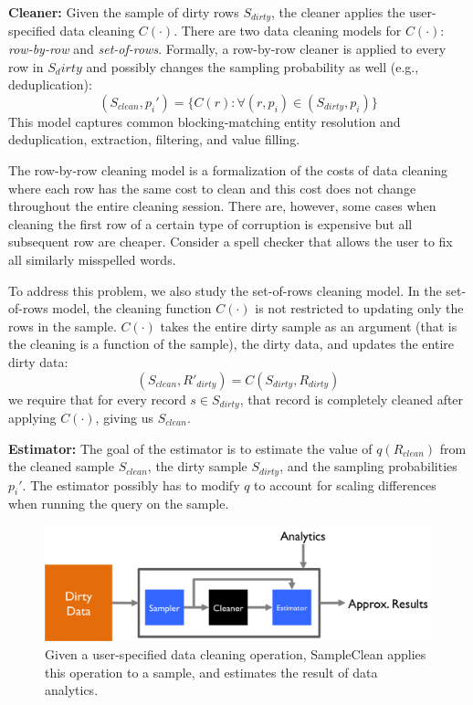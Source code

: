\vspace{0.5em}
\noindent\textbf{Cleaner: }
Given the sample of dirty rows $S_{dirty}$,  the cleaner applies the user-specified data cleaning $C(\cdot)$. There are two data cleaning models for $C(\cdot)$: \emph{row-by-row} and \emph{set-of-rows}.
Formally, a row-by-row cleaner is applied to every row in $S_dirty$ and possibly changes the sampling probability as well (e.g., deduplication):
\[
(S_{clean},p_i') = \{C(r) : \forall (r,p_i) \in (S_{dirty},p_i)\}
\]
This model captures common blocking-matching entity resolution and deduplication, extraction, filtering, and value filling.

The row-by-row cleaning model is a formalization of the costs of data cleaning where each row has the same cost to clean and this cost does not change throughout the entire cleaning session.
There are, however, some cases when cleaning the first row of a certain type of corruption is expensive but all subsequent row are cheaper.
Consider a spell checker that allows the user to fix all similarly misspelled words. 

To address this problem, we also study the set-of-rows cleaning model.
In the set-of-rows model, the cleaning function $C(\cdot)$ is not restricted to updating only the rows in the sample.
$C(\cdot)$ takes the entire dirty sample as an argument (that is the cleaning is a function of the sample), the dirty data, and updates the entire dirty data:
\[
(S_{clean}, R'_{dirty}) = C(S_{dirty},R_{dirty})
\]
we require that for every record $s \in S_{dirty}$, that record is completely cleaned after applying $C(\cdot)$, giving us $S_{clean}$.

\vspace{0.5em}
\noindent\textbf{Estimator: } The goal of the estimator is to estimate the value of $q(R_{clean})$ from the cleaned sample $S_{clean}$, the dirty sample $S_{dirty}$, and the sampling probabilities $p_i'$. The estimator possibly has to modify $q$ to account for scaling differences when running the query on the sample.

\begin{figure}
\includegraphics[width=.5\columnwidth]{figs/arch.png}
\caption{Given a user-specified data cleaning operation, SampleClean applies this operation to a sample, and estimates the result of data analytics. \label{fig:arch}}
\end{figure}

